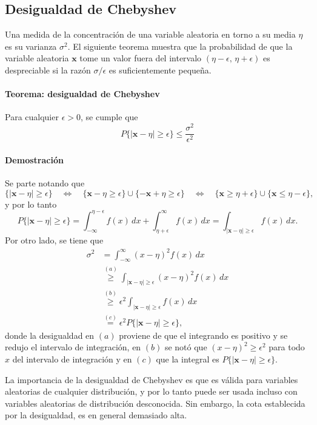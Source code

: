 \documentclass[a4paper]{report}
\newcommand{\x}{\mathbf{x}}
\begin{document}
\subsection{Desigualdad de Chebyshev}

Una medida de la concentración de una variable aleatoria en torno a su media \(\eta\) es su varianza \(\sigma^2\). El siguiente teorema muestra que la probabilidad de que la variable aleatoria \(\x\) tome un valor fuera del intervalo \((\eta-\epsilon,\,\eta+\epsilon)\) es despreciable si la razón \(\sigma/\epsilon\) es suficientemente pequeña.

\paragraph{Teorema: desigualdad de Chebyshev} Para cualquier \(\epsilon>0\), se cumple que
\begin{equation}\label{eq:chebyshev_inequality}
 P\{|\x-\eta|\geq\epsilon\}\leq \frac{\sigma^2}{\epsilon^2}
\end{equation}

\paragraph{Demostración} Se parte notando que
\[
 \{|\x-\eta|\geq\epsilon\} \quad \Leftrightarrow \quad \{\x-\eta\geq\epsilon\}\cup\{-\x+\eta\geq\epsilon\} 
 \quad \Leftrightarrow \quad \{\x\geq\eta+\epsilon\}\cup\{\x\leq\eta-\epsilon\},
\]
y por lo tanto
\[
 P\{|\x-\eta|\geq\epsilon\}=\int_{-\infty}^{\eta-\epsilon}f(x)\,dx+\int_{\eta+\epsilon}^{\infty}f(x)\,dx=\int_{|\x-\eta|\geq\epsilon}f(x)\,dx.
\]
Por otro lado, se tiene que
\begin{align*}
 \sigma^2&=\int_{-\infty}^{\infty}(x-\eta)^2f(x)\,dx\\
   &\overset{(a)}{\geq}\int_{|\x-\eta|\geq\epsilon}(x-\eta)^2f(x)\,dx\\
   &\overset{(b)}{\geq}\epsilon^2\int_{|\x-\eta|\geq\epsilon}f(x)\,dx\\
   &\overset{(c)}{=}\epsilon^2P\{|\x-\eta|\geq\epsilon\},
\end{align*}
donde la desigualdad en \((a)\) proviene de que el integrando es positivo y se redujo el intervalo de integración, en \((b)\) se notó que \((x-\eta)^2\geq\epsilon^2\) para todo \(x\) del intervalo de integración y en \((c)\) que la integral es \(P\{|\x-\eta|\geq\epsilon\}\).

La importancia de la desigualdad de Chebyshev es que es válida para variables aleatorias de cualquier distribución, y por lo tanto puede ser usada incluso con variables aleatorias de distribución desconocida. Sin embargo, la cota establecida por la desigualdad, es en general demasiado alta.
\end{document}
